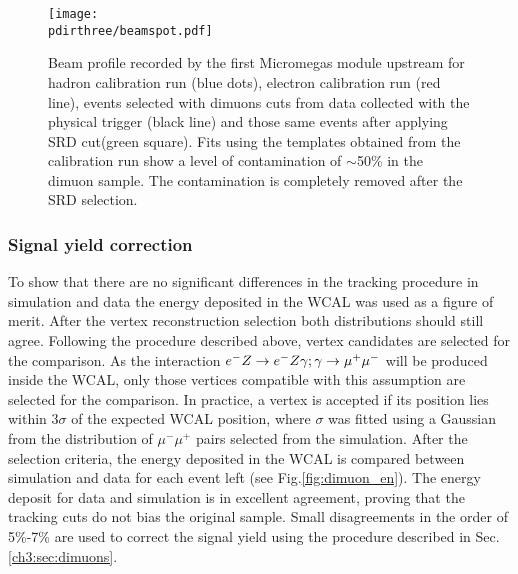\begin{figure}[tbh!]
  \centering
    \texttt{[image: \\pdirthree/beamspot.pdf]}
  \caption[Beam profile with different cuts]{Beam profile recorded by the first Micromegas module upstream for hadron calibration run (blue dots), electron calibration run (red line), events selected with dimuons cuts from data collected with the physical trigger (black line) and those same events after applying SRD cut(green square). Fits using the templates obtained from the calibration run show a level of contamination of $\sim$50\% in the dimuon sample. The contamination is completely removed after the SRD selection.}
  \label{fig:dimuon:profile}
\end{figure}


\subsubsection{Signal yield correction}
\label{ch3:sec:dimuons-sig-corr}

To show that there are no significant differences in the tracking procedure in simulation and data the energy deposited in the WCAL was used as a figure of merit. After the vertex reconstruction selection both distributions should still agree. %
Following the procedure described above, vertex candidates are selected for the comparison. As the interaction $e^- Z \to e^- Z \gamma; \gamma \to \mu^+ \mu^-$ will be produced inside the WCAL, only those vertices compatible with this assumption are selected for the comparison. In practice, a vertex is accepted if its position lies within 3$\sigma$ of the expected WCAL position, where $\sigma$ was fitted using a Gaussian from the distribution of $\mu^- \mu^+$ pairs selected from the simulation. After the selection criteria, the energy deposited in the WCAL is compared between simulation and data for each event left (see Fig.\ref{fig:dimuon_en}). The energy deposit for data and simulation is in excellent agreement, proving that the tracking cuts do not bias the original sample. Small disagreements in the order of 5\%-7\% are used to correct the signal yield using the procedure described in Sec.\ref{ch3:sec:dimuons}.

